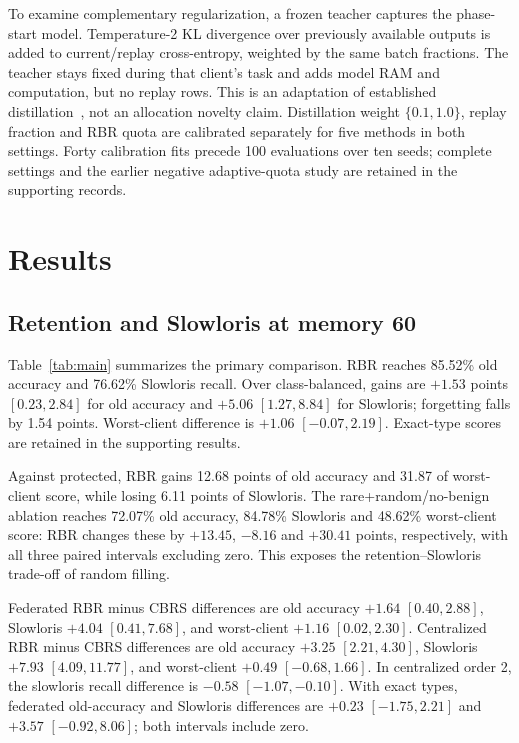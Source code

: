 \documentclass[journal,10pt]{IEEEtran}
\begin{document}
To examine complementary regularization, a frozen teacher captures the phase-start model. Temperature-2 KL divergence over previously available outputs is added to current/replay cross-entropy, weighted by the same batch fractions. The teacher stays fixed during that client's task and adds model RAM and computation, but no replay rows. This is an adaptation of established distillation~\cite{lwf}, not an allocation novelty claim. Distillation weight $\{0.1,1.0\}$, replay fraction and RBR quota are calibrated separately for five methods in both settings. Forty calibration fits precede 100 evaluations over ten seeds; complete settings and the earlier negative adaptive-quota study are retained in the supporting records.

\section{Results}


\subsection{Retention and Slowloris at memory 60}
Table~\ref{tab:main} summarizes the primary comparison. RBR reaches 85.52\% old accuracy and 76.62\% Slowloris recall. Over class-balanced, gains are $+1.53$ points $[0.23,2.84]$ for old accuracy and $+5.06$ $[1.27,8.84]$ for Slowloris; forgetting falls by 1.54 points. Worst-client difference is $+1.06$ $[-0.07,2.19]$. Exact-type scores are retained in the supporting results.

Against protected, RBR gains 12.68 points of old accuracy and 31.87 of worst-client score, while losing 6.11 points of Slowloris. The rare+random/no-benign ablation reaches 72.07\% old accuracy, 84.78\% Slowloris and 48.62\% worst-client score: RBR changes these by $+13.45$, $-8.16$ and $+30.41$ points, respectively, with all three paired intervals excluding zero. This exposes the retention--Slowloris trade-off of random filling.

Federated RBR minus CBRS differences are old accuracy $+1.64$ $[0.40,2.88]$, Slowloris $+4.04$ $[0.41,7.68]$, and worst-client $+1.16$ $[0.02,2.30]$. Centralized RBR minus CBRS differences are old accuracy $+3.25$ $[2.21,4.30]$, Slowloris $+7.93$ $[4.09,11.77]$, and worst-client $+0.49$ $[-0.68,1.66]$. In centralized order 2, the slowloris recall difference is $-0.58$ $[-1.07,-0.10]$. With exact types, federated old-accuracy and Slowloris differences are $+0.23$ $[-1.75,2.21]$ and $+3.57$ $[-0.92,8.06]$; both intervals include zero.
\end{document}

